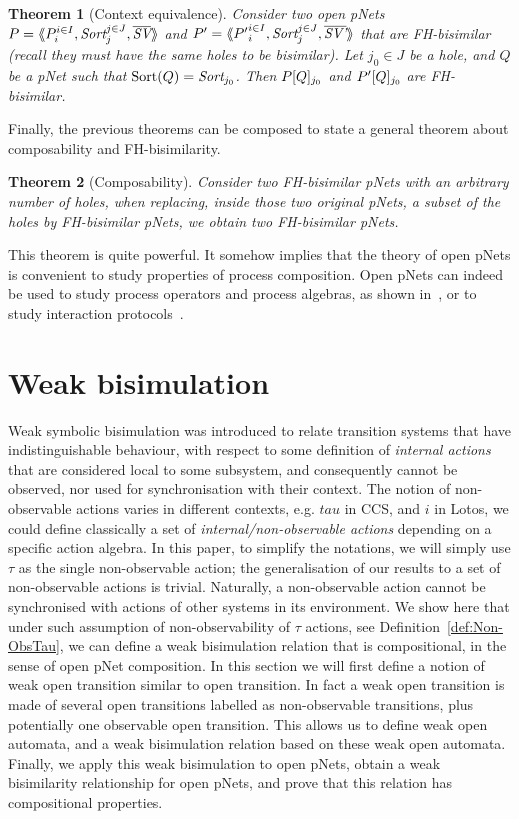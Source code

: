 \documentclass{lmcs}
\newtheorem{theorem}{Theorem}
\begin{document}
 
\begin{theorem}[Context equivalence]\label{thm-ctxt-eq}
	Consider two  open pNets
	$\pNet = \mylangle \pNet_i^{i\in I}, \Sort_j^{j\in J}, 
	\set{\symb{SV}}\myrangle$ and 	$\pNet' = \mylangle {\pNet'}_i^{i\in I}, 
	\Sort_j^{j\in 
	J}, 	\set{\symb{SV'}}\myrangle$ that are FH-bisimilar
	(recall they must have the same holes to be bisimilar).
	Let $j_0\in J$ be a hole, and $Q$ be a pNet such that $\Sortop(Q)=\Sort_{j_0}$. Then 
	$P[Q]_{j_0}$ and 
	$P'[Q]_{j_0}$ are FH-bisimilar.
\end{theorem}

Finally, the previous theorems can be composed to state a general theorem about 
composability and FH-bisimilarity.
\begin{theorem}[Composability] \label{thm-composability}
	Consider two FH-bisimilar pNets with an arbitrary number of holes, when replacing, 
	inside those two original pNets, a subset of the holes by FH-bisimilar pNets, we 
	obtain two FH-bisimilar pNets.
\end{theorem}
This theorem is quite powerful. It somehow implies that the theory of open pNets is convenient to study properties of process composition. Open pNets can indeed be used to study process operators and process algebras, as shown in~\cite{henrio:Forte2016}, or to study interaction protocols~\cite{BHHM:FACS11}.

\section{Weak bisimulation}\label{sec:weak}

Weak symbolic bisimulation was introduced to relate transition systems
that have indistinguishable behaviour, with respect to some definition
of \emph{internal actions} that are considered local to some
subsystem, and consequently cannot be observed, nor used for
synchronisation with their context.
The notion of non-observable actions varies in different contexts,
e.g. $tau$ in CCS, and $i$ in Lotos, we could define classically a set of
\emph{internal/non-observable actions} depending on a specific action
algebra. In this paper, to simplify the notations, we will simply use $\tau$ as the single non-observable action; the generalisation of our results to a set of non-observable actions is trivial. 
Naturally, a non-observable action cannot be synchronised with
actions of other systems in its environment. 
We show here that under such assumption of non-observability of $\tau$ actions, see Definition~\ref{def:Non-ObsTau}, we can define a weak bisimulation relation that is compositional, in the sense of open pNet composition. In this section we will first define a notion of weak open transition similar to open transition. In fact a weak open transition is made of several open transitions labelled as non-observable transitions, plus potentially one observable open transition. This allows us to define weak open automata, and a weak bisimulation relation based on these weak open automata. Finally, we apply this weak bisimulation to open pNets, obtain a weak bisimilarity relationship for open pNets, and prove that this relation has compositional properties.
\end{document}
